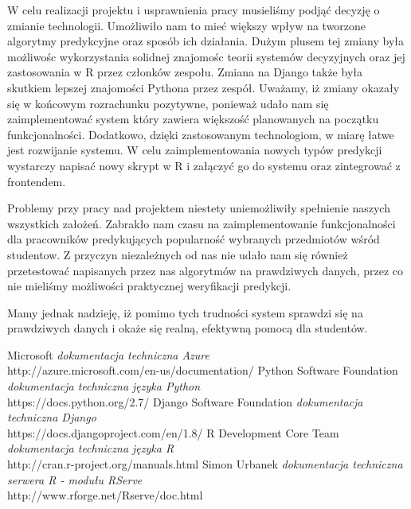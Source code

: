 \documentclass[licencjacka]{pracamgr}
\begin{document}
W celu realizacji projektu i usprawnienia pracy musieliśmy podjąć decyzję o zmianie technologii. Umożliwiło nam to mieć większy wpływ na tworzone algorytmy predykcyjne oraz sposób ich działania. Dużym plusem tej zmiany była możliwośc wykorzystania solidnej znajomośc teorii systemów decyzyjnych oraz jej zastosowania w R przez członków zespołu. Zmiana na Django także była skutkiem lepszej znajomości Pythona przez zespół. Uważamy, iż zmiany okazały się w końcowym rozrachunku pozytywne, ponieważ udało nam się zaimplementować system który zawiera większość planowanych na początku funkcjonalności. Dodatkowo, dzięki zastosowanym technologiom, w miarę łatwe jest rozwijanie systemu. W celu zaimplementowania nowych typów predykcji wystarczy napisać nowy skrypt w R i załączyć go do systemu oraz zintegrować z frontendem.

Problemy przy pracy nad projektem niestety uniemożliwiły spełnienie naszych wszystkich założeń. Zabrakło nam czasu na zaimplementowanie funkcjonalności dla pracowników predykujących popularność wybranych przedmiotów wśród studentow. Z przyczyn niezależnych od nas nie udało nam się również przetestować napisanych przez nas algorytmów na prawdziwych danych, przez co nie mieliśmy możliwości praktycznej weryfikacji predykcji. 

Mamy jednak nadzieję, iż pomimo tych trudności system sprawdzi się na prawdziwych danych i okaże się realną, efektywną pomocą dla studentów.


\begin{thebibliography}{99}
 Microsoft
\textit{dokumentacja techniczna Azure} \\
http://azure.microsoft.com/en-us/documentation/
Python Software Foundation
\textit{dokumentacja techniczna języka Python} \\
https://docs.python.org/2.7/
 Django Software Foundation
\textit{dokumentacja techniczna Django} \\ 
https://docs.djangoproject.com/en/1.8/
 R Development Core Team
\textit{dokumentacja techniczna języka R} \\
http://cran.r-project.org/manuals.html
 Simon Urbanek
\textit{dokumentacja techniczna serwera R - modułu RServe} \\
http://www.rforge.net/Rserve/doc.html
\end{thebibliography}
\end{document}
